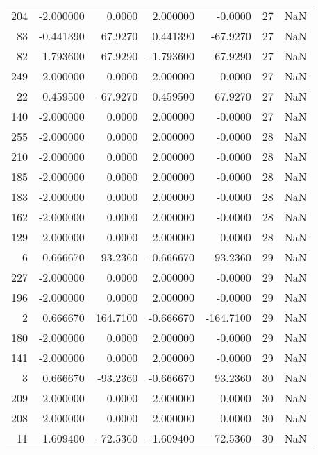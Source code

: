 \begin{tabular}{rrrrrrr}
204 &  -2.000000 &    0.0000 &   2.000000 &     -0.0000 &          27 & NaN \\
 83 &  -0.441390 &   67.9270 &   0.441390 &    -67.9270 &          27 & NaN \\
 82 &   1.793600 &   67.9290 &  -1.793600 &    -67.9290 &          27 & NaN \\
249 &  -2.000000 &    0.0000 &   2.000000 &     -0.0000 &          27 & NaN \\
 22 &  -0.459500 &  -67.9270 &   0.459500 &     67.9270 &          27 & NaN \\
140 &  -2.000000 &    0.0000 &   2.000000 &     -0.0000 &          27 & NaN \\
255 &  -2.000000 &    0.0000 &   2.000000 &     -0.0000 &          28 & NaN \\
210 &  -2.000000 &    0.0000 &   2.000000 &     -0.0000 &          28 & NaN \\
185 &  -2.000000 &    0.0000 &   2.000000 &     -0.0000 &          28 & NaN \\
183 &  -2.000000 &    0.0000 &   2.000000 &     -0.0000 &          28 & NaN \\
162 &  -2.000000 &    0.0000 &   2.000000 &     -0.0000 &          28 & NaN \\
129 &  -2.000000 &    0.0000 &   2.000000 &     -0.0000 &          28 & NaN \\
  6 &   0.666670 &   93.2360 &  -0.666670 &    -93.2360 &          29 & NaN \\
227 &  -2.000000 &    0.0000 &   2.000000 &     -0.0000 &          29 & NaN \\
196 &  -2.000000 &    0.0000 &   2.000000 &     -0.0000 &          29 & NaN \\
  2 &   0.666670 &  164.7100 &  -0.666670 &   -164.7100 &          29 & NaN \\
180 &  -2.000000 &    0.0000 &   2.000000 &     -0.0000 &          29 & NaN \\
141 &  -2.000000 &    0.0000 &   2.000000 &     -0.0000 &          29 & NaN \\
  3 &   0.666670 &  -93.2360 &  -0.666670 &     93.2360 &          30 & NaN \\
209 &  -2.000000 &    0.0000 &   2.000000 &     -0.0000 &          30 & NaN \\
208 &  -2.000000 &    0.0000 &   2.000000 &     -0.0000 &          30 & NaN \\
 11 &   1.609400 &  -72.5360 &  -1.609400 &     72.5360 &          30 & NaN \\

\end{tabular}
